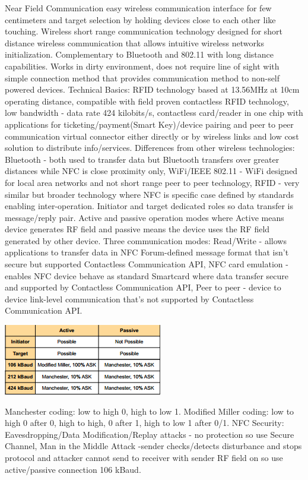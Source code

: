 \documentclass[9pt]{extarticle}
\begin{document}
\begin{multicols}{2}
Near Field Communication easy wireless communication interface for few centimeters and target selection by holding devices close to each other like touching. Wireless short range communication technology designed for short distance wireless communication that allows intuitive wireless networks initialization. Complementary to Bluetooth and 802.11 with long distance capabilities. Works in dirty environment, does not require line of sight with simple connection method that provides communication method to non-self powered devices. Technical Basics: RFID technology based at 13.56MHz at 10cm operating distance, compatible with field proven contactless RFID technology, low bandwidth - data rate 424 kilobits/s, contactless card/reader in one chip with applications for ticketing/payment(Smart Key)/device pairing and peer to peer communication virtual connector either directly or by wireless links and low cost solution to distribute info/services. Differences from other wireless technologies: Bluetooth - both used to transfer data but Bluetooth transfers over greater distances while NFC is close proximity only,  WiFi/IEEE 802.11 - WiFi designed for local area networks and not short range peer to peer technology, RFID - very similar but broader technology where NFC is specific case defined by standards enabling inter-operation. Initiator and target dedicated roles so data transfer is message/reply pair. Active and passive operation modes where Active means device generates RF field and passive means the device uses the RF field generated by other device. Three communication modes: Read/Write - allows applications to transfer data in NFC Forum-defined message format that isn't secure but supported Contactless Communication API, NFC card emulation - enables NFC device behave as standard Smartcard where data transfer secure and supported by Contactless Communication API, Peer to peer - device to device link-level communication that's not supported by Contactless Communication API. 

\includegraphics{moredetails.png}

Manchester coding: low to high 0, high to low 1. Modified Miller coding: low to high 0 after 0, high to high, 0 after 1, high to low 1 after 0/1. NFC Security: Eavesdropping/Data Modification/Replay attacks - no protection so use Secure Channel, Man in the Middle Attack -sender checks/detects disturbance and stops protocol and attacker cannot send to receiver with sender RF field on so use active/passive connection 106 kBaud. 


\end{multicols}
\end{document}
